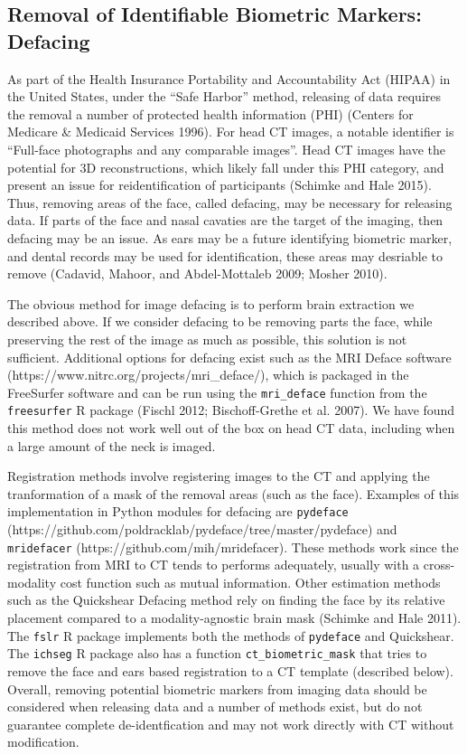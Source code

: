 \documentclass[]{elsarticle} %
\begin{document}
\hypertarget{removal-of-identifiable-biometric-markers-defacing}{%
\subsection{Removal of Identifiable Biometric Markers: Defacing}\label{removal-of-identifiable-biometric-markers-defacing}}

As part of the Health Insurance Portability and Accountability Act (HIPAA) in the United States, under the ``Safe Harbor'' method, releasing of data requires the removal a number of protected health information (PHI) (Centers for Medicare \& Medicaid Services 1996). For head CT images, a notable identifier is ``Full-face photographs and any comparable images''. Head CT images have the potential for 3D reconstructions, which likely fall under this PHI category, and present an issue for reidentification of participants (Schimke and Hale 2015). Thus, removing areas of the face, called defacing, may be necessary for releasing data. If parts of the face and nasal cavaties are the target of the imaging, then defacing may be an issue. As ears may be a future identifying biometric marker, and dental records may be used for identification, these areas may desriable to remove (Cadavid, Mahoor, and Abdel-Mottaleb 2009; Mosher 2010).

The obvious method for image defacing is to perform brain extraction we described above. If we consider defacing to be removing parts the face, while preserving the rest of the image as much as possible, this solution is not sufficient. Additional options for defacing exist such as the MRI Deface software (https://www.nitrc.org/projects/mri\_deface/), which is packaged in the FreeSurfer software and can be run using the \texttt{mri\_deface} function from the \texttt{freesurfer} R package (Fischl 2012; Bischoff-Grethe et al. 2007). We have found this method does not work well out of the box on head CT data, including when a large amount of the neck is imaged.

Registration methods involve registering images to the CT and applying the tranformation of a mask of the removal areas (such as the face). Examples of this implementation in Python modules for defacing are \texttt{pydeface} (https://github.com/poldracklab/pydeface/tree/master/pydeface) and \texttt{mridefacer} (https://github.com/mih/mridefacer). These methods work since the registration from MRI to CT tends to performs adequately, usually with a cross-modality cost function such as mutual information. Other estimation methods such as the Quickshear Defacing method rely on finding the face by its relative placement compared to a modality-agnostic brain mask (Schimke and Hale 2011). The \texttt{fslr} R package implements both the methods of \texttt{pydeface} and Quickshear. The \texttt{ichseg} R package also has a function \texttt{ct\_biometric\_mask} that tries to remove the face and ears based registration to a CT template (described below). Overall, removing potential biometric markers from imaging data should be considered when releasing data and a number of methods exist, but do not guarantee complete de-identfication and may not work directly with CT without modification.
\end{document}
